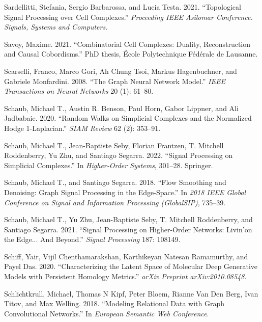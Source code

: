 \documentclass[
  12pt,
]{krantz}
\newlength{\cslhangindent}
\newenvironment{CSLReferences}[2] %
 {\begin{list}{}{%
  \setlength{\itemindent}{0pt}
  \setlength{\leftmargin}{0pt}
  \setlength{\parsep}{0pt}
  \ifodd #1
   \setlength{\leftmargin}{\cslhangindent}
   \setlength{\itemindent}{-1\cslhangindent}
  \fi
  \setlength{\itemsep}{#2\baselineskip}}}
 {\end{list}}
\begin{document}
\begin{CSLReferences}{1}{0}
Sardellitti, Stefania, Sergio Barbarossa, and Lucia Testa. 2021.
{``Topological Signal Processing over Cell Complexes.''}
\emph{Proceeding IEEE Asilomar Conference. Signals, Systems and
Computers}.

Savoy, Maxime. 2021. {``Combinatorial Cell Complexes: Duality,
Reconstruction and Causal Cobordisms.''} PhD thesis, École Polytechnique
Fédérale de Lausanne.

Scarselli, Franco, Marco Gori, Ah Chung Tsoi, Markus Hagenbuchner, and
Gabriele Monfardini. 2008. {``The Graph Neural Network Model.''}
\emph{IEEE Transactions on Neural Networks} 20 (1): 61--80.

Schaub, Michael T., Austin R. Benson, Paul Horn, Gabor Lippner, and Ali
Jadbabaie. 2020. {``Random Walks on Simplicial Complexes and the
Normalized {H}odge 1-{L}aplacian.''} \emph{SIAM Review} 62 (2): 353--91.

Schaub, Michael T., Jean-Baptiste Seby, Florian Frantzen, T. Mitchell
Roddenberry, Yu Zhu, and Santiago Segarra. 2022. {``Signal Processing on
Simplicial Complexes.''} In \emph{Higher-Order Systems}, 301--28.
Springer.

Schaub, Michael T., and Santiago Segarra. 2018. {``Flow Smoothing and
Denoising: Graph Signal Processing in the Edge-Space.''} In \emph{2018
IEEE Global Conference on Signal and Information Processing
(GlobalSIP)}, 735--39.

Schaub, Michael T., Yu Zhu, Jean-Baptiste Seby, T. Mitchell Roddenberry,
and Santiago Segarra. 2021. {``Signal Processing on Higher-Order
Networks: Livin'on the Edge... And Beyond.''} \emph{Signal Processing}
187: 108149.

Schiff, Yair, Vijil Chenthamarakshan, Karthikeyan Natesan Ramamurthy,
and Payel Das. 2020. {``Characterizing the Latent Space of Molecular
Deep Generative Models with Persistent Homology Metrics.''} \emph{arXiv
Preprint arXiv:2010.08548}.

Schlichtkrull, Michael, Thomas N Kipf, Peter Bloem, Rianne Van Den Berg,
Ivan Titov, and Max Welling. 2018. {``Modeling Relational Data with
Graph Convolutional Networks.''} In \emph{European Semantic Web
Conference}.


\end{CSLReferences}
\end{document}
